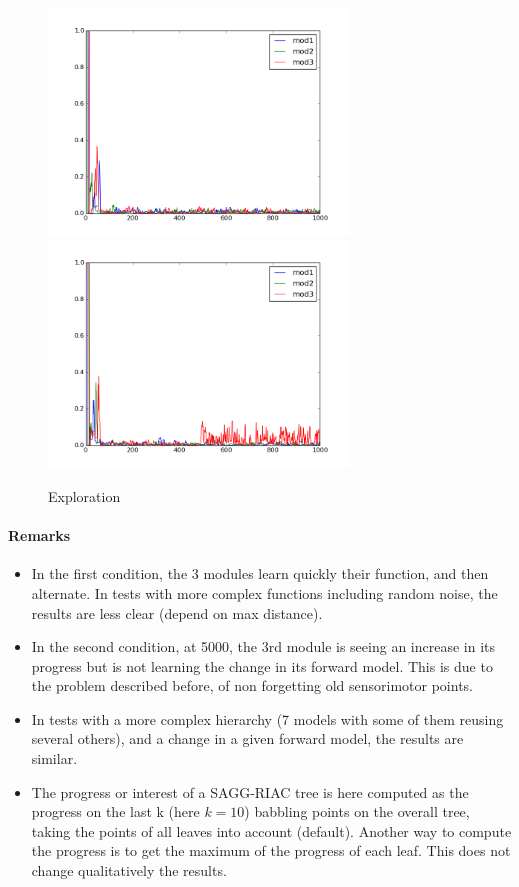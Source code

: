 \documentclass[12pt]{article}
\begin{document}
		
		\begin{figure}[H]
			\centering
			\includegraphics[width=8cm]{./include/Test_DAG_3mods_f=id-_1000.png}
			\includegraphics[width=8cm]{./include/Test_DAG_3mods_f=id_change_500-_1000.png}
			\caption{Exploration }
		\end{figure}
	
		\paragraph{Remarks}
		\begin{itemize}
			\item In the first condition, the 3 modules learn quickly their function, and then alternate. 
					In tests with more complex functions including random noise, the results are less clear (depend on max distance).
			\item In the second condition, at 5000, the 3rd module is seeing an increase in its progress but is not learning the change in its forward model.
					This is due to the problem described before, of non forgetting old sensorimotor points.
			\item In tests with a more complex hierarchy (7 models with some of them reusing several others), and a change in a given forward model, the results are similar.
			\item The progress or interest of a SAGG-RIAC tree is here computed as the progress on the last k (here $k=10$) babbling points on the overall tree, taking the points of all leaves into account (default).
					Another way to compute the progress is to get the maximum of the progress of each leaf. This does not change qualitatively the results.
		\end{itemize}
		
\end{document}
